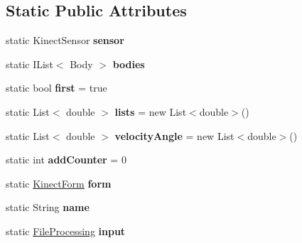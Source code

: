 \subsection*{Static Public Attributes}
\begin{DoxyCompactItemize}
\item 
static Kinect\+Sensor {\bfseries sensor}\hypertarget{classkinect_expirement_1_1_kinect_sensor_class_adc9d831584e42495c1ade995e2b7296b}{}\label{classkinect_expirement_1_1_kinect_sensor_class_adc9d831584e42495c1ade995e2b7296b}

\item 
static I\+List$<$ Body $>$ {\bfseries bodies}\hypertarget{classkinect_expirement_1_1_kinect_sensor_class_afa0208c2f32b2863875380181f23a968}{}\label{classkinect_expirement_1_1_kinect_sensor_class_afa0208c2f32b2863875380181f23a968}

\item 
static bool {\bfseries first} = true\hypertarget{classkinect_expirement_1_1_kinect_sensor_class_a0849964fe5f5f578aa0acd1309f9c485}{}\label{classkinect_expirement_1_1_kinect_sensor_class_a0849964fe5f5f578aa0acd1309f9c485}

\item 
static List$<$ double $>$ {\bfseries lists} = new List$<$double$>$()\hypertarget{classkinect_expirement_1_1_kinect_sensor_class_a7ae7082005aeaaf8ac981d39fecfa466}{}\label{classkinect_expirement_1_1_kinect_sensor_class_a7ae7082005aeaaf8ac981d39fecfa466}

\item 
static List$<$ double $>$ {\bfseries velocity\+Angle} = new List$<$double$>$()\hypertarget{classkinect_expirement_1_1_kinect_sensor_class_a42a0ce3cb624cf8224a8c86353e2b453}{}\label{classkinect_expirement_1_1_kinect_sensor_class_a42a0ce3cb624cf8224a8c86353e2b453}

\item 
static int {\bfseries add\+Counter} = 0\hypertarget{classkinect_expirement_1_1_kinect_sensor_class_a83d086426821c4d842d3f82465b57ae0}{}\label{classkinect_expirement_1_1_kinect_sensor_class_a83d086426821c4d842d3f82465b57ae0}

\item 
static \hyperlink{classkinect_expirement_1_1_kinect_form}{Kinect\+Form} {\bfseries form}\hypertarget{classkinect_expirement_1_1_kinect_sensor_class_a0fc223d227f5f3f11b851738fae84be2}{}\label{classkinect_expirement_1_1_kinect_sensor_class_a0fc223d227f5f3f11b851738fae84be2}

\item 
static String {\bfseries name}\hypertarget{classkinect_expirement_1_1_kinect_sensor_class_a920f2c46b543d2b82c9698baf8b3c91f}{}\label{classkinect_expirement_1_1_kinect_sensor_class_a920f2c46b543d2b82c9698baf8b3c91f}

\item 
static \hyperlink{classkinect_expirement_1_1_file_processing}{File\+Processing} {\bfseries input}\hypertarget{classkinect_expirement_1_1_kinect_sensor_class_a05569b27d1abcbf09a4b84cd16ee5b3b}{}\label{classkinect_expirement_1_1_kinect_sensor_class_a05569b27d1abcbf09a4b84cd16ee5b3b}

\end{DoxyCompactItemize}



